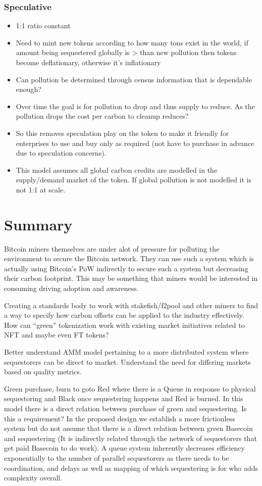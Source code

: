 \documentclass{article}
\begin{document}
\subsubsection{Speculative}

\begin{itemize}
\item 1:1 ratio constant
\item Need to mint new tokens according to how many tons exist in the world, if amount being
sequestered globally is > than new pollution then tokens become deflationary, otherwise
it's inflationary
\item Can pollution be determined through census information that is dependable enough?
\item Over time the goal is for pollution to drop and thus supply to reduce. As the pollution
drops the cost per carbon to cleanup reduces?
\item So this removes speculation play on the token to make it friendly for enterprises to use
and buy only as required (not have to purchase in advance due to speculation
concerns).
\item This model assumes all global carbon credits are modelled in the supply/demand market
of the token. If global pollution is not modelled it is not 1:1 at scale.
\end{itemize}


\section{Summary}

Bitcoin miners themselves are under alot of pressure for polluting the environment to secure the
Bitcoin network. They can use such a system which is actually using Bitcoin’s PoW indirectly to
secure such a system but decreasing their carbon footprint. This may be something that miners
would be interested in consuming driving adoption and awareness.

Creating a standards body to work with stakefish/f2pool and other miners to find a way to
specify how carbon offsets can be applied to the industry effectively. How can “green”
tokenization work with existing market initiatives related to NFT and maybe even FT tokens?

Better understand AMM model pertaining to a more distributed system where sequestorers can
be direct to market. Understand the need for differing markets based on quality metrics.

Green purchase, burn to goto Red where there is a Queue in response to physical sequestoring
and Black once sequestering happens and Red is burned. In this model there is a direct relation
between purchase of green and sequestering. Is this a requirement? In the proposed design we
establish a more frictionless system but do not assume that there is a direct relation between
green Basecoin and sequestering (It is indirectly related through the network of sequestorers
that get paid Basecoin to do work). A queue system inherently decreases efficiency
exponentially to the number of parallel sequestorers as there needs to be coordination, and
delays as well as mapping of which sequestering is for who adds complexity overall.
\end{document}
